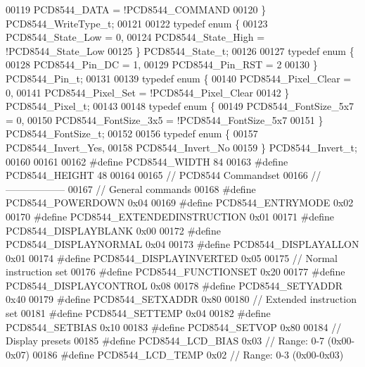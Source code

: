 \begin{DoxyCode}
00119     PCD8544\_DATA = !PCD8544\_COMMAND
00120 \} PCD8544\_WriteType\_t;
00121 
00122 \textcolor{keyword}{typedef} \textcolor{keyword}{enum} \{
00123     PCD8544\_State\_Low = 0,
00124     PCD8544\_State\_High = !PCD8544\_State\_Low
00125 \} PCD8544\_State\_t;
00126 
00127 \textcolor{keyword}{typedef} \textcolor{keyword}{enum} \{
00128     PCD8544\_Pin\_DC = 1,
00129     PCD8544\_Pin\_RST = 2
00130 \} PCD8544\_Pin\_t;
00131 
00139 \textcolor{keyword}{typedef} \textcolor{keyword}{enum} \{
00140     PCD8544\_Pixel\_Clear = 0,
00141     PCD8544\_Pixel\_Set = !PCD8544\_Pixel\_Clear
00142 \} PCD8544\_Pixel\_t;
00143 
00148 \textcolor{keyword}{typedef} \textcolor{keyword}{enum} \{
00149     PCD8544\_FontSize\_5x7 = 0,
00150     PCD8544\_FontSize\_3x5 = !PCD8544\_FontSize\_5x7
00151 \} PCD8544\_FontSize\_t;
00152 
00156 \textcolor{keyword}{typedef} \textcolor{keyword}{enum} \{
00157     PCD8544\_Invert\_Yes,
00158     PCD8544\_Invert\_No
00159 \} PCD8544\_Invert\_t;
00160 
00161 
00162 \textcolor{preprocessor}{#define PCD8544\_WIDTH               84}
00163 \textcolor{preprocessor}{#define PCD8544\_HEIGHT              48}
00164 
00165 \textcolor{comment}{// PCD8544 Commandset}
00166 \textcolor{comment}{// ------------------}
00167 \textcolor{comment}{// General commands}
00168 \textcolor{preprocessor}{#define PCD8544\_POWERDOWN           0x04}
00169 \textcolor{preprocessor}{#define PCD8544\_ENTRYMODE           0x02}
00170 \textcolor{preprocessor}{#define PCD8544\_EXTENDEDINSTRUCTION 0x01}
00171 \textcolor{preprocessor}{#define PCD8544\_DISPLAYBLANK        0x00}
00172 \textcolor{preprocessor}{#define PCD8544\_DISPLAYNORMAL       0x04}
00173 \textcolor{preprocessor}{#define PCD8544\_DISPLAYALLON        0x01}
00174 \textcolor{preprocessor}{#define PCD8544\_DISPLAYINVERTED     0x05}
00175 \textcolor{comment}{// Normal instruction set}
00176 \textcolor{preprocessor}{#define PCD8544\_FUNCTIONSET         0x20}
00177 \textcolor{preprocessor}{#define PCD8544\_DISPLAYCONTROL      0x08}
00178 \textcolor{preprocessor}{#define PCD8544\_SETYADDR            0x40}
00179 \textcolor{preprocessor}{#define PCD8544\_SETXADDR            0x80}
00180 \textcolor{comment}{// Extended instruction set}
00181 \textcolor{preprocessor}{#define PCD8544\_SETTEMP             0x04}
00182 \textcolor{preprocessor}{#define PCD8544\_SETBIAS             0x10}
00183 \textcolor{preprocessor}{#define PCD8544\_SETVOP              0x80}
00184 \textcolor{comment}{// Display presets}
00185 \textcolor{preprocessor}{#define PCD8544\_LCD\_BIAS            0x03    // Range: 0-7 (0x00-0x07)}
00186 \textcolor{preprocessor}{#define PCD8544\_LCD\_TEMP            0x02    // Range: 0-3 (0x00-0x03)}

\end{DoxyCode}
